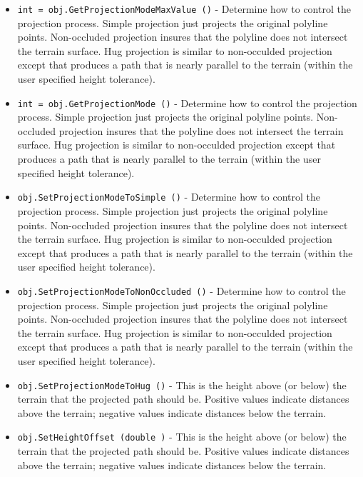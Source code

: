 \begin{itemize}
\item  \verb|int = obj.GetProjectionModeMaxValue ()| -  Determine how to control the projection process. Simple projection
 just projects the original polyline points. Non-occluded projection
 insures that the polyline does not intersect the terrain surface.
 Hug projection is similar to non-occulded projection except that
 produces a path that is nearly parallel to the terrain (within the
 user specified height tolerance).

\item  \verb|int = obj.GetProjectionMode ()| -  Determine how to control the projection process. Simple projection
 just projects the original polyline points. Non-occluded projection
 insures that the polyline does not intersect the terrain surface.
 Hug projection is similar to non-occulded projection except that
 produces a path that is nearly parallel to the terrain (within the
 user specified height tolerance).

\item  \verb|obj.SetProjectionModeToSimple ()| -  Determine how to control the projection process. Simple projection
 just projects the original polyline points. Non-occluded projection
 insures that the polyline does not intersect the terrain surface.
 Hug projection is similar to non-occulded projection except that
 produces a path that is nearly parallel to the terrain (within the
 user specified height tolerance).

\item  \verb|obj.SetProjectionModeToNonOccluded ()| -  Determine how to control the projection process. Simple projection
 just projects the original polyline points. Non-occluded projection
 insures that the polyline does not intersect the terrain surface.
 Hug projection is similar to non-occulded projection except that
 produces a path that is nearly parallel to the terrain (within the
 user specified height tolerance).

\item  \verb|obj.SetProjectionModeToHug ()| -  This is the height above (or below) the terrain that the projected
 path should be. Positive values indicate distances above the terrain;
 negative values indicate distances below the terrain. 

\item  \verb|obj.SetHeightOffset (double )| -  This is the height above (or below) the terrain that the projected
 path should be. Positive values indicate distances above the terrain;
 negative values indicate distances below the terrain. 


\end{itemize}
